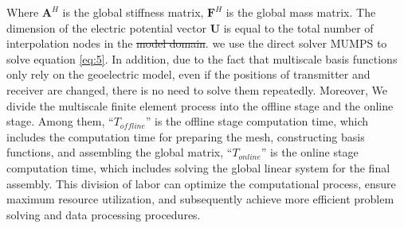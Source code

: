 \documentclass[manuscript,blind]{geophysics}
\providecommand{\DIFadd}[1]{{\protect\color{blue}\uwave{#1}}} %
\providecommand{\DIFdel}[1]{{\protect\color{red}\sout{#1}}}                      %
\providecommand{\DIFaddbegin}{} %
\providecommand{\DIFaddend}{} %
\providecommand{\DIFdelbegin}{} %
\providecommand{\DIFdelend}{} %
\newcommand{\DIFscaledelfig}{0.5}
\newlength{\DIFdelgraphicswidth} %
\newlength{\DIFdelgraphicsheight} %
\newcommand{\DIFaddincludegraphics}[2][]{{\color{blue}\fbox{\DIFOincludegraphics[#1]{#2}}}} %
\newcommand{\DIFdelincludegraphics}[2][]{%
\sbox{\DIFdelgraphicsbox}{\DIFOincludegraphics[#1]{#2}}%
\settoboxwidth{\DIFdelgraphicswidth}{\DIFdelgraphicsbox} %
\settoboxtotalheight{\DIFdelgraphicsheight}{\DIFdelgraphicsbox} %
\scalebox{\DIFscaledelfig}{%
\parbox[b]{\DIFdelgraphicswidth}{\usebox{\DIFdelgraphicsbox}\\[-\baselineskip] \rule{\DIFdelgraphicswidth}{0em}}\llap{\resizebox{\DIFdelgraphicswidth}{\DIFdelgraphicsheight}{%
\setlength{\unitlength}{\DIFdelgraphicswidth}%
\begin{picture}(1,1)%
\thicklines\linethickness{2pt} %
{\color[rgb]{1,0,0}\put(0,0){\framebox(1,1){}}}%
{\color[rgb]{1,0,0}\put(0,0){\line( 1,1){1}}}%
{\color[rgb]{1,0,0}\put(0,1){\line(1,-1){1}}}%
\end{picture}%
}\hspace*{3pt}}} %
} %
\DeclareRobustCommand{\DIFaddbegin}{\DIFOaddbegin \let\includegraphics\DIFaddincludegraphics} %
\DeclareRobustCommand{\DIFaddend}{\DIFOaddend \let\includegraphics\DIFOincludegraphics} %
\DeclareRobustCommand{\DIFdelbegin}{\DIFOdelbegin \let\includegraphics\DIFdelincludegraphics} %
\DeclareRobustCommand{\DIFdelend}{\DIFOaddend \let\includegraphics\DIFOincludegraphics} %
\begin{document}
Where ${\mathbf{A}^H}$ is the global stiffness matrix, ${\mathbf{F}^H}$ is the global mass matrix. The dimension of the electric potential vector $\mathbf{U}$ is equal to the total number of interpolation nodes in the \DIFdelbegin \DIFdel{model domain}\DIFdelend \DIFaddbegin \DIFadd{coarse mesh}\DIFaddend . we use the direct solver MUMPS to solve equation \ref{eq:5}. In addition, due to the fact that multiscale basis functions only rely on the geoelectric model, even if the positions of transmitter and receiver are changed, there is no need to solve them repeatedly. Moreover, We divide the multiscale finite element process into the offline stage and the online stage. Among them, “${T_{offline}}$” is the offline stage computation time, which includes the computation time for preparing the mesh, constructing basis functions, and assembling the global matrix, “${T_{online}}$” is the online stage computation time, which includes solving the global linear system for the final assembly. This division of labor can optimize the computational process, ensure maximum resource utilization, and subsequently achieve more efficient problem solving and data processing procedures.
\end{document}
